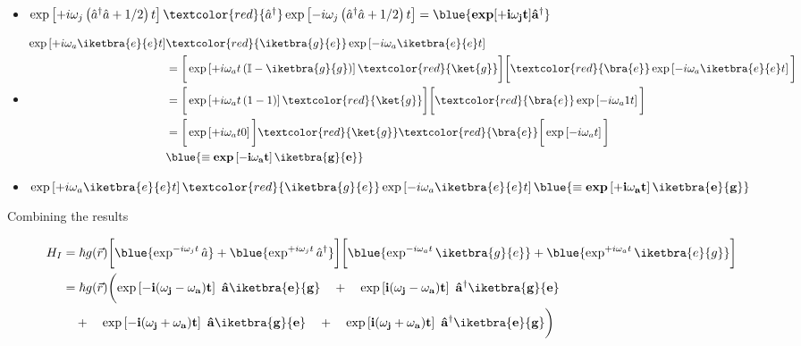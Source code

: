 \begin{itemize}
	\item $\exp\left[+i\omega_j\left(\hat{a}^\dagger\hat{a}+{1}/{2}\right)t\right]\textcolor{red}{\hat{a}^\dagger}\exp\left[-i\omega_j\left(\hat{a}^\dagger\hat{a}+{1}/{2}\right)t\right] = \blue{\mathbf{\text{\textbf{exp}}[+i\omega_jt]\hat{a}^\dagger}}$
	
	\item \begin{equation}
	\begin{aligned}
	\exp\left[+i\omega_a\iketbra{e}{e}t\right]&\textcolor{red}{\iketbra{g}{e}}\exp\left[-i\omega_a\iketbra{e}{e}t\right] \\
	& = \bigg[\exp\left[+i\omega_at\left(\mathbb{I} - \iketbra{g}{g}\right)\right]\textcolor{red}{\ket{g}}\bigg]\bigg[\textcolor{red}{\bra{e}}\exp\left[-i\omega_a\iketbra{e}{e}t\right]\bigg]\\
	& = \bigg[\exp\left[+i\omega_at\left(1 - 1\right)\right]\textcolor{red}{\ket{g}}\bigg]\bigg[\textcolor{red}{\bra{e}}\exp\left[-i\omega_a1t\right]\bigg]\\
	& = \bigg[\exp\left[+i\omega_at0\right]\bigg]\textcolor{red}{\ket{g}}\textcolor{red}{\bra{e}}\bigg[\exp\left[-i\omega_at\right]\bigg]\\
	& \blue{\mathbf{\equiv \text{\textbf{exp}}\left[-i\omega_at\right]\iketbra{g}{e}}}
	\end{aligned}
	\end{equation}
	\item $\exp\left[+i\omega_a\iketbra{e}{e}t\right]\textcolor{red}{\iketbra{g}{e}}\exp\left[-i\omega_a\iketbra{e}{e}t\right] \blue{\mathbf{\equiv \text{\textbf{exp}}\left[+i\omega_at\right]\iketbra{e}{g}}} $
\end{itemize}

Combining the results

\begin{equation}
\begin{aligned}
H_I & = \hbar g(\vec{r})\bigg[\blue{\exp^{-i\omega_jt}\hat{a}}+\blue{\exp^{+i\omega_jt}\hat{a}^\dagger}\bigg]\bigg[\blue{\exp^{-i\omega_at}\iketbra{g}{e}}+\blue{\exp^{+i\omega_at}\iketbra{e}{g}}\bigg] \\
& = \hbar g(\vec{r})\bigg(\mathbf{\exp\left[-i(\omega_j-\omega_a)t\right]\ \hat{a}\iketbra{e}{g}} \quad + \quad \mathbf{\exp\left[i(\omega_j-\omega_a)t\right]\ \hat{a}^\dagger\iketbra{g}{e}} \\
& \quad + \quad \mathbf{\exp\left[-i(\omega_j+\omega_a)t\right]\ \hat{a}\iketbra{g}{e}} \quad + \quad \mathbf{\exp\left[i(\omega_j+\omega_a)t\right]\ \hat{a}^\dagger\iketbra{e}{g}}\bigg)
\end{aligned}
\label{eqn:fullHamiltonianLightAtom}
\end{equation}

